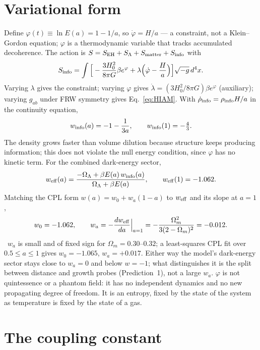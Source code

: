 \section{Variational form}\label{sec:var}
Define $\varphi(t)\equiv\ln E(a)=1-1/a$, so $\dot\varphi=H/a$ --- a constraint, not a Klein--Gordon equation; $\varphi$ is a thermodynamic variable that
tracks accumulated decoherence. The action is $S=S_{\rm EH}+S_\Lambda+S_{\rm matter}+S_{\rm info}$ with
\begin{equation}S_{\rm info}=\int\Big[-\frac{3H_0^2}{8\pi G}\beta e^{\varphi}+\lambda\Big(\dot\varphi-\frac Ha\Big)\Big]\sqrt{-g}\,d^4x .\end{equation}
Varying $\lambda$ gives the constraint; varying $\varphi$ gives $\dot\lambda=(3H_0^2/8\pi G)\beta e^\varphi$ (auxiliary); varying $g_{ab}$ under FRW symmetry
gives Eq.~\eqref{eq:HIAM}. With $\dot\rho_{\rm info}=\rho_{\rm info}H/a$ in the continuity equation,
\begin{equation}w_{\rm info}(a)=-1-\frac{1}{3a},\qquad w_{\rm info}(1)=-\tfrac43 .\end{equation}
The density grows faster than volume dilution because structure keeps producing information; this does not violate the null energy condition, since
$\varphi$ has no kinetic term. For the combined dark-energy sector,
\begin{equation}w_{\rm eff}(a)=\frac{-\Omega_\Lambda+\beta E(a)\,w_{\rm info}(a)}{\Omega_\Lambda+\beta E(a)},\qquad w_{\rm eff}(1)=-1.062 .\end{equation}
Matching the CPL form $w(a)=w_0+w_a(1-a)$ to $w_{\rm eff}$ and its slope at $a=1$,
\begin{equation}w_0=-1.062,\qquad w_a=-\frac{dw_{\rm eff}}{da}\Big|_{a=1}=-\frac{\Omega_m^2}{3(2-\Omega_m)^2}=-0.012 .\end{equation}
\calc\ $w_a$ is small and of fixed sign for $\Omega_m=0.30$--$0.32$; a least-squares CPL fit over $0.5\le a\le1$ gives $w_0=-1.065$, $w_a=+0.017$. Either way the
model's dark-energy sector stays close to $w_a=0$ and below $w=-1$; what distinguishes it is the split between distance and growth probes (Prediction~1),
not a large $w_a$.
$\varphi$ is not quintessence or a phantom field: it has no independent dynamics and no new propagating degree of freedom. It is an entropy, fixed by the
state of the system as temperature is fixed by the state of a gas.

\section{The coupling constant}
